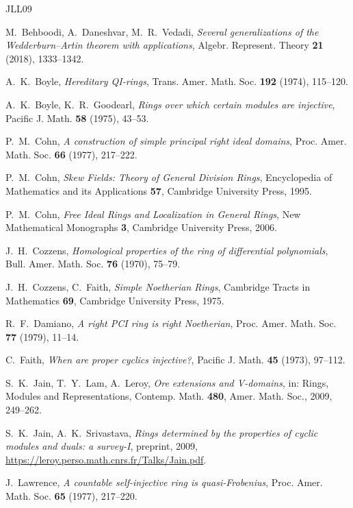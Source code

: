 \documentclass[11pt]{amsart}
\theoremstyle{plain}
\theoremstyle{definition}
\theoremstyle{remark}
\begin{document}
\begin{thebibliography}{JLL09}

 M.~Behboodi, A.~Daneshvar, M.~R.~Vedadi, \emph{Several generalizations of the Wedderburn--Artin theorem with applications}, Algebr. Represent. Theory \textbf{21} (2018), 1333--1342.

 A.~K.~Boyle, \emph{Hereditary QI-rings}, Trans. Amer. Math. Soc. \textbf{192} (1974), 115--120.

 A.~K.~Boyle, K.~R.~Goodearl, \emph{Rings over which certain modules are injective}, Pacific J. Math. \textbf{58} (1975), 43--53.

 P.~M.~Cohn, \emph{A construction of simple principal right ideal domains}, Proc. Amer. Math. Soc. \textbf{66} (1977), 217--222.

 P.~M.~Cohn, \emph{Skew Fields: Theory of General Division Rings}, Encyclopedia of Mathematics and its Applications \textbf{57}, Cambridge University Press, 1995.

 P.~M.~Cohn, \emph{Free Ideal Rings and Localization in General Rings}, New Mathematical Monographs \textbf{3}, Cambridge University Press, 2006.

 J.~H.~Cozzens, \emph{Homological properties of the ring of differential polynomials}, Bull. Amer. Math. Soc. \textbf{76} (1970), 75--79.

 J.~H.~Cozzens, C.~Faith, \emph{Simple Noetherian Rings}, Cambridge Tracts in Mathematics \textbf{69}, Cambridge University Press, 1975.

 R.~F.~Damiano, \emph{A right PCI ring is right Noetherian}, Proc. Amer. Math. Soc. \textbf{77} (1979), 11--14.

 C.~Faith, \emph{When are proper cyclics injective?}, Pacific J. Math. \textbf{45} (1973), 97--112.

 S.~K.~Jain, T.~Y.~Lam, A.~Leroy, \emph{Ore extensions and V-domains}, in: Rings, Modules and Representations, Contemp. Math. \textbf{480}, Amer. Math. Soc., 2009, 249--262.

 S.~K.~Jain, A.~K.~Srivastava, \emph{Rings determined by the properties of cyclic modules and duals: a survey-I}, preprint, 2009, \url{https://leroy.perso.math.cnrs.fr/Talks/Jain.pdf}.

 J.~Lawrence, \emph{A countable self-injective ring is quasi-Frobenius}, Proc. Amer. Math. Soc. \textbf{65} (1977), 217--220.

\end{thebibliography}
\end{document}
